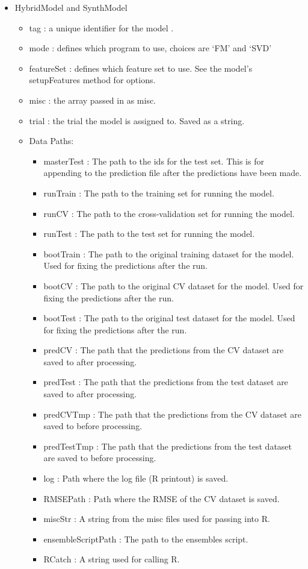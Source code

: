 \documentclass{article}
\begin{document}
\begin{itemize}
\item HybridModel and SynthModel
	\begin{itemize}
	\item tag : a unique identifier for the model .
	\item mode : defines which program to use, choices are `FM' and `SVD' \item featureSet : defines which feature set to use. See the model's setupFeatures method for options.
	\item misc : the array passed in as misc. 
	\item trial : the trial the model is assigned to. Saved as a string.
	\item Data Paths:
		\begin{itemize}
		\item masterTest : The path to the ids for the test set. This is for appending to the prediction file after the predictions have been made.
		\item runTrain : The path to the training set for running the model.
		\item runCV : The path to the cross-validation set for running the model.
		\item runTest : The path to the test set for running the model.
		\item bootTrain : The path to the original training dataset for the model. Used for fixing the predictions after the run.
		\item bootCV : The path to the original CV dataset for the model. Used for fixing the predictions after the run.
		\item bootTest : The path to the original test dataset for the model. Used for fixing the predictions after the run.
		\item predCV : The path that the predictions from the CV dataset are saved to after processing.
		\item predTest : The path that the predictions from the test dataset are saved to after processing.
		\item predCVTmp : The path that the predictions from the CV dataset are saved to before processing.
		\item predTestTmp : The path that the predictions from the test dataset are saved to before processing.
		\item log : Path where the log file (R printout) is saved.
		\item RMSEPath : Path where the RMSE of the CV dataset is saved.
		\item miscStr : A string from the misc files used for passing into R.
		\item ensembleScriptPath : The path to the ensembles script.
		\item RCatch : A string used for calling R.
		\end{itemize}
	\end{itemize}
\end{itemize}
\end{document}
